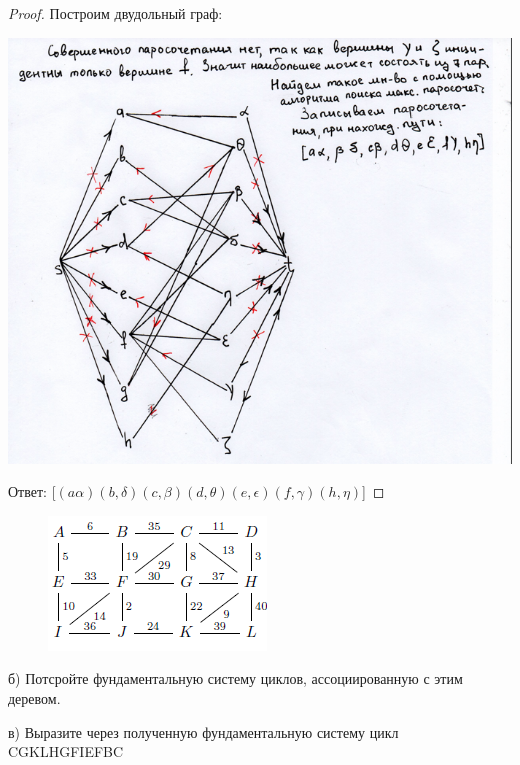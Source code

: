 \begin{proof}
    Построим двудольный граф:
    
    \centering\includegraphics[width=1\linewidth]{pics/15thSolution.png}

    Ответ: [$(a\alpha) (b,\delta) (c,\beta) (d,\theta) (e,\epsilon) (f,\gamma) (h,\eta)$]
    
\end{proof}

\begin{problem}[16]
    
    \begin{figure}[h]
    \centering
     \includegraphics[width=0.35\linewidth]{pics/Graph16th.png}
     \label{fig:dm}
    \end{figure}

    б) Потсройте фундаментальную систему циклов, ассоциированную с этим деревом.

    в) Выразите через полученную фундаментальную систему цикл CGKLHGFIEFBC
    
\end{problem}

